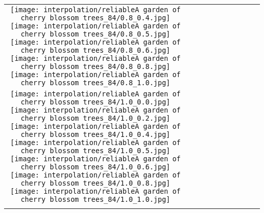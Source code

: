 \documentclass[10pt,twocolumn,letterpaper]{article}
\begin{document}
\begin{figure*}[tb!]
{\begin{tabular}{c c c c c c c c c c}
   \texttt{[image: interpolation/reliableA garden of cherry blossom trees\_84/0.8\_0.4.jpg]}
  \texttt{[image: interpolation/reliableA garden of cherry blossom trees\_84/0.8\_0.5.jpg]}
  \texttt{[image: interpolation/reliableA garden of cherry blossom trees\_84/0.8\_0.6.jpg]}
  \texttt{[image: interpolation/reliableA garden of cherry blossom trees\_84/0.8\_0.8.jpg]}
  \texttt{[image: interpolation/reliableA garden of cherry blossom trees\_84/0.8\_1.0.jpg]}
\tabularnewline
    \raisebox{0.1in}{\rotatebox{90}{\small \emph{}
 }}
  \texttt{[image: interpolation/reliableA garden of cherry blossom trees\_84/1.0\_0.0.jpg]}
  \texttt{[image: interpolation/reliableA garden of cherry blossom trees\_84/1.0\_0.2.jpg]}
   \texttt{[image: interpolation/reliableA garden of cherry blossom trees\_84/1.0\_0.4.jpg]}
  \texttt{[image: interpolation/reliableA garden of cherry blossom trees\_84/1.0\_0.5.jpg]}
  \texttt{[image: interpolation/reliableA garden of cherry blossom trees\_84/1.0\_0.6.jpg]}
  \texttt{[image: interpolation/reliableA garden of cherry blossom trees\_84/1.0\_0.8.jpg]}
  \texttt{[image: interpolation/reliableA garden of cherry blossom trees\_84/1.0\_1.0.jpg]}
    \tabularnewline
        \raisebox{0.1in}{\rotatebox{90}{
 }}
 \hspace{0.5mm}


\end{tabular}}
\end{figure*}
\end{document}
